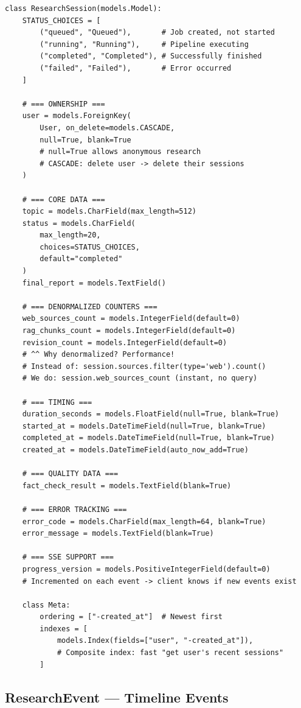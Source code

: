 \documentclass[11pt,a4paper,twoside]{report}
\begin{document}
\begin{lstlisting}[style=pythonstyle]
class ResearchSession(models.Model):
    STATUS_CHOICES = [
        ("queued", "Queued"),       # Job created, not started
        ("running", "Running"),     # Pipeline executing
        ("completed", "Completed"), # Successfully finished
        ("failed", "Failed"),       # Error occurred
    ]

    # === OWNERSHIP ===
    user = models.ForeignKey(
        User, on_delete=models.CASCADE,
        null=True, blank=True
        # null=True allows anonymous research
        # CASCADE: delete user -> delete their sessions
    )

    # === CORE DATA ===
    topic = models.CharField(max_length=512)
    status = models.CharField(
        max_length=20,
        choices=STATUS_CHOICES,
        default="completed"
    )
    final_report = models.TextField()

    # === DENORMALIZED COUNTERS ===
    web_sources_count = models.IntegerField(default=0)
    rag_chunks_count = models.IntegerField(default=0)
    revision_count = models.IntegerField(default=0)
    # ^^ Why denormalized? Performance!
    # Instead of: session.sources.filter(type='web').count()
    # We do: session.web_sources_count (instant, no query)

    # === TIMING ===
    duration_seconds = models.FloatField(null=True, blank=True)
    started_at = models.DateTimeField(null=True, blank=True)
    completed_at = models.DateTimeField(null=True, blank=True)
    created_at = models.DateTimeField(auto_now_add=True)

    # === QUALITY DATA ===
    fact_check_result = models.TextField(blank=True)

    # === ERROR TRACKING ===
    error_code = models.CharField(max_length=64, blank=True)
    error_message = models.TextField(blank=True)

    # === SSE SUPPORT ===
    progress_version = models.PositiveIntegerField(default=0)
    # Incremented on each event -> client knows if new events exist

    class Meta:
        ordering = ["-created_at"]  # Newest first
        indexes = [
            models.Index(fields=["user", "-created_at"]),
            # Composite index: fast "get user's recent sessions"
        ]
\end{lstlisting}

\subsection{ResearchEvent --- Timeline Events}
\end{document}
